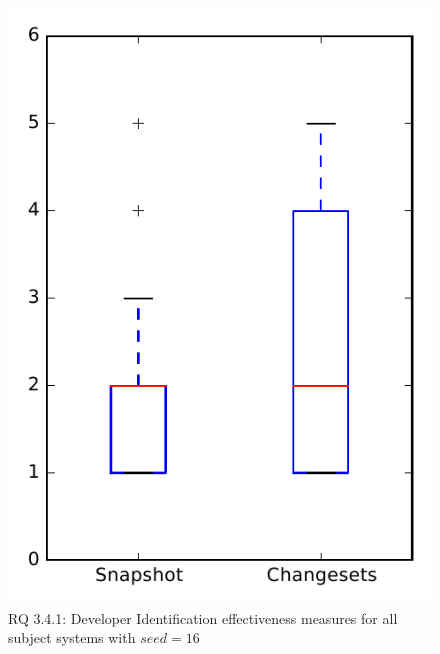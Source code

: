 
\begin{figure}
\centering
\includegraphics[height=0.4\textheight]{figures/dit_seed/rq1_overview_16}
\caption{RQ 3.4.1: Developer Identification effectiveness measures for all subject systems with $seed=16$}
\label{fig:dit_seed:rq1:overview}
\end{figure}
